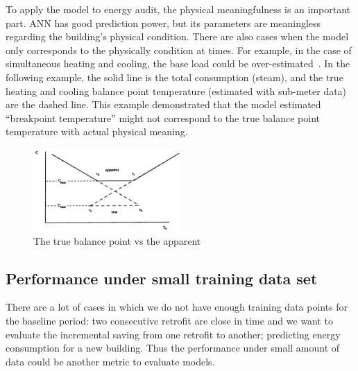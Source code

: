 \documentclass[12pt]{article}
\begin{document}
To apply the model to energy audit, the physical meaningfulness is an
important part. ANN has good prediction power, but its parameters are
meaningless regarding the building's physical condition. There are
also cases when the model only corresponds to the physically condition at times.
For example, in the case of simultaneous heating and cooling, the base
load could be over-estimated~\cite{rabl1992energy}. In the following
example, the solid line is the total consumption (steam), and the true
heating and cooling balance point temperature (estimated with
sub-meter data) are the dashed line. This example demonstrated that
the model estimated ``breakpoint temperature'' might not correspond to
the true balance point temperature with actual physical meaning.
\begin{figure}[h!]
  \centering
  \includegraphics[width=0.5\textwidth]{images/apparentVsTrue.png}
  \caption{The true balance point vs the apparent~\cite{rabl1992energy}}
  \label{fig:asf}
\end{figure}
\FloatBarrier
\subsection{Performance under small training data set}
There are a lot of cases in which we do not have enough training data
points for the baseline period: two consecutive retrofit are close in
time and we want to evaluate the incremental saving from one retrofit
to another; predicting energy consumption for a new building. Thus the
performance under small amount of data could be another metric to
evaluate models.

\end{document}
